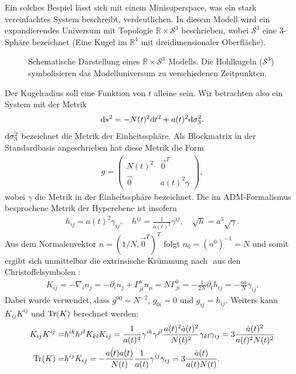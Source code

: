 \documentclass{scrartcl}
\begin{document}
			Ein solches Bespiel \cite{PhysRevD.28.2960} lässt sich mit einem Minisuperspace, was ein stark vereinfachtes System 
			beschreibt, verdeutlichen. In diesem Modell wird ein expandierendes Universum mit Topologie
			$\mathbb{R}\times \mathcal{S}^3$ beschrieben, wobei $\mathcal{S}^3$ eine 3-Sphäre bezeichnet (Eine Kugel im $\mathbb{R}^4$ mit dreidimensionaler Oberfläche).
			\begin{figure}
				\centering
				
				\caption{Schematische Darstellung eines $\mathbb{R}\times\mathcal{S}^3$ Modells. Die Hohlkugeln ($\mathcal{S}^3$) symbolisieren das Modelluniversum zu verschiedenen Zeitpunkten.}
			\end{figure}
			Der Kugelradius soll eine Funktion von $t$ alleine sein. Wir betrachten also ein System mit der Metrik
			\begin{align}
				{\rm d}s^2=-N(t)^2 {\rm d}t^2+a(t)^2{\rm d}\sigma_3^2.
			\end{align}
			${\rm d}\sigma_3^2$ bezeichnet die Metrik der Einheitssphäre. Als Blockmatrix in der Standardbasis angeschrieben hat diese Metrik
			die Form 
			\begin{align}
				g=\left(
					\begin{array}{cc} 
						N(t)^2 & \vec{0}^T\\ 
						\vec{0} & a(t)^2 \gamma
					\end{array}\right),
			\end{align}
			wobei $\gamma$ die Metrik in der Einheitssphäre bezeichnet. Die im ADM-Formalismus besprochene Metrik der Hyperebene ist insofern
			\begin{align}
				h_{ij}=a(t)^2\gamma_{ij},\quad h^{ij}=\frac{1}{a(t)^2}\gamma^{ij},\quad \sqrt{h}=a^3\sqrt{\gamma}.
			\end{align}
			Aus dem Normalenvektor $n=(1/N,\vec{0}^T)^T$ folgt $n_0=(n^0)^{-1}=N$ und somit ergibt sich unmittelbar die extrinsische Krümmung nach $\label{def:extrcurv}$
			aus den Christoffelsymbolen \label{def:christ}:
			\begin{align}
				K_{ij}=-\nabla_i n_j=-\partial_i n_j+\Gamma^\mu_{ji}n_\mu=N\Gamma^0_{ji}=-\frac{1}{2N}\partial_t h_{ij}=-\frac{\dot{a}a}{N}\gamma_{ij}.
			\end{align}
			Dabei wurde verwendet, dass $g^{00}=N^{-2}$, $g_{0i}=0$ und $g_{ij}=h_{ij}$. Weiters kann $K_{ij}K^{ij}$ und ${\rm Tr}(K)$ berechnet werden:
			\begin{align}
				K_{ij}K^{ij}=&h^{ik}h^{jl}K_{kl}K_{ij}=\frac{1}{a(t)^4}\gamma^{ik}\gamma^{jl}\frac{a(t)^2\dot{a}(t)^2}{N(t)^2}\gamma_{kl}\gamma_{ij}=3\frac{\dot{a}(t)^2}{a(t)^2 N(t)^2}\\
				{\rm Tr}(K)=&h^{ij}K_{ij}=-\frac{\dot{a(t)}a(t)}{ N(t)}\frac{1}{a(t)}\gamma^{ij}\gamma_{ij}=3\frac{\dot{a}(t)}{a(t) N(t)}.
			\end{align}
\end{document}
